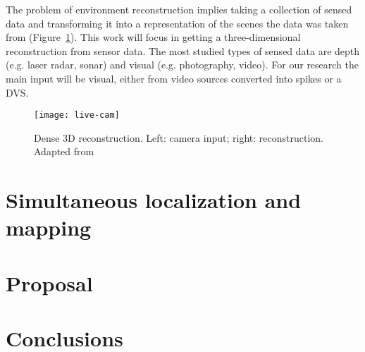 The problem of environment reconstruction implies taking a collection of sensed data and transforming it into a representation of the scenes the data was taken from (Figure~\ref{fig:slam:example}). This work will focus in getting a three-dimensional reconstruction from sensor data. The most studied types of sensed data are depth (e.g. laser radar, sonar) and visual (e.g. photography, video). For our research the main input will be visual, either from video sources converted into spikes or a DVS. 

\begin{figure}[h]
  \begin{center}
    \texttt{[image: live-cam]}
    \caption{Dense 3D reconstruction. Left: camera input; right: reconstruction. Adapted from~\cite{livecam}}
    \label{fig:slam:example}
  \end{center}
\end{figure}

\section{Simultaneous localization and mapping}



\section{Proposal}



\section{Conclusions}
